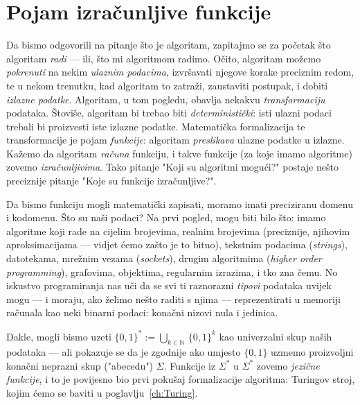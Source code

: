 \section{Pojam izračunljive funkcije}

Da bismo odgovorili na pitanje što je algoritam, zapitajmo se za početak što algoritam \emph{radi}  --- ili, što mi algoritmom radimo. Očito, algoritam možemo \emph{pokrenuti} na nekim \emph{ulaznim podacima}, izvršavati njegove korake preciznim redom, te u nekom trenutku, kad algoritam to zatraži, zaustaviti postupak, i dobiti \emph{izlazne podatke}. Algoritam, u tom pogledu, obavlja nekakvu \emph{transformaciju} podataka. Štoviše, algoritam bi trebao biti \emph{deterministički}: isti ulazni podaci trebali bi proizvesti iste izlazne podatke. Matematička formalizacija te transformacije je pojam \emph{funkcije}: algoritam \emph{preslikava} ulazne podatke u izlazne. Kažemo da algoritam \emph{računa} funkciju, i takve funkcije (za koje imamo algoritme) zovemo \emph{izračunljivima}. Tako pitanje "Koji su algoritmi mogući?" postaje nešto preciznije pitanje "Koje su funkcije izračunljive?".


Da bismo funkciju mogli matematički zapisati, moramo imati preciziranu domenu i kodomenu. Što su naši podaci?
Na prvi pogled, mogu biti bilo što: imamo algoritme koji rade na cijelim brojevima, realnim brojevima (preciznije, njihovim aproksimacijama --- vidjet ćemo zašto je to bitno), tekstnim podacima (\emph{strings}), datotekama, mrežnim vezama (\emph{sockets}), drugim algoritmima (\emph{higher order programming}), grafovima, objektima, regularnim izrazima, i tko zna čemu. No iskustvo programiranja nas uči da se svi ti raznorazni \emph{tipovi} podataka uvijek mogu --- i moraju, ako želimo nešto raditi s njima --- reprezentirati u memoriji računala kao neki binarni podaci: konačni nizovi nula i jedinica.

Dakle, mogli bismo uzeti $\{0,1\}^*:=\bigcup_{k\in\mathbb N}\,\{0,1\}^k$ kao univerzalni skup naših podataka --- ali pokazuje se da je zgodnije ako umjesto $\{0,1\}$ uzmemo proizvoljni konačni neprazni skup ("abecedu") $\Sigma$. Funkcije iz $\Sigma^*$ u $\Sigma^*$ zovemo \emph{jezične funkcije}, i to je povijesno bio prvi pokušaj formalizacije algoritma: Turingov stroj, kojim ćemo se baviti u poglavlju~\ref{ch:Turing}.

